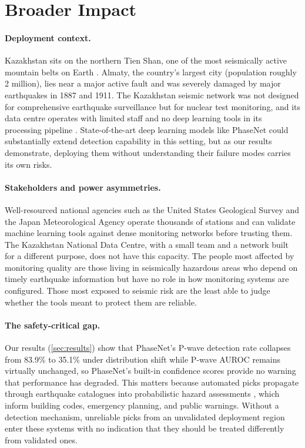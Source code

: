 \section*{Broader Impact}

\paragraph{Deployment context.} Kazakhstan sits on the northern Tien Shan, one of the most seismically active mountain belts on Earth \citep{abdrakhmatov1996tienshanGPS}. Almaty, the country's largest city (population roughly 2 million), lies near a major active fault \citep{amey2021almaty} and was severely damaged by major earthquakes in 1887 and 1911. The Kazakhstan seismic network was not designed for comprehensive earthquake surveillance but for nuclear test monitoring, and its data centre operates with limited staff and no deep learning tools in its processing pipeline \citep{mikhailova2019kndc}. State-of-the-art deep learning models like PhaseNet could substantially extend detection capability in this setting, but as our results demonstrate, deploying them without understanding their failure modes carries its own risks.

\paragraph{Stakeholders and power asymmetries.} Well-resourced national agencies such as the United States Geological Survey and the Japan Meteorological Agency operate thousands of stations and can validate machine learning tools against dense monitoring networks before trusting them. The Kazakhstan National Data Centre, with a small team and a network built for a different purpose, does not have this capacity. The people most affected by monitoring quality are those living in seismically hazardous areas who depend on timely earthquake information but have no role in how monitoring systems are configured. Those most exposed to seismic risk are the least able to judge whether the tools meant to protect them are reliable.

\paragraph{The safety-critical gap.} Our results (\cref{sec:results}) show that PhaseNet's P-wave detection rate collapses from 83.9\% to 35.1\% under distribution shift while P-wave AUROC remains virtually unchanged, so PhaseNet's built-in confidence scores provide no warning that performance has degraded. This matters because automated picks propagate through earthquake catalogues into probabilistic hazard assessments \citep{cornell1968psha}, which inform building codes, emergency planning, and public warnings. Without a detection mechanism, unreliable picks from an unvalidated deployment region enter these systems with no indication that they should be treated differently from validated ones.


